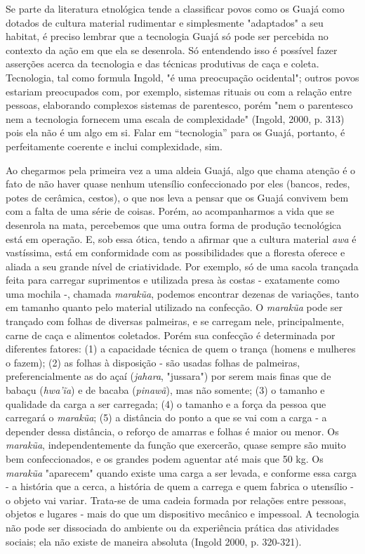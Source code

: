 Se parte da literatura etnológica tende a classificar povos como os
Guajá como dotados de cultura material rudimentar e simplesmente
"adaptados" a seu habitat, é preciso lembrar que a tecnologia Guajá só
pode ser percebida no contexto da ação em que ela se desenrola. Só
entendendo isso é possível fazer asserções acerca da tecnologia e das
técnicas produtivas de caça e coleta. Tecnologia, tal como formula
Ingold, "é uma preocupação ocidental"; outros povos estariam preocupados
com, por exemplo, sistemas rituais ou com a relação entre pessoas,
elaborando complexos sistemas de parentesco, porém "nem o parentesco nem
a tecnologia fornecem uma escala de complexidade" (Ingold, 2000, p. 313)
pois ela não é um algo em si. Falar em ``tecnologia'' para os Guajá,
portanto, é perfeitamente coerente e inclui complexidade, sim.

Ao chegarmos pela primeira vez a uma aldeia Guajá, algo que chama
atenção é o fato de não haver quase nenhum utensílio confeccionado por
eles (bancos, redes, potes de cerâmica, cestos), o que nos leva a pensar
que os Guajá convivem bem com a falta de uma série de coisas. Porém, ao
acompanharmos a vida que se desenrola na mata, percebemos que uma outra
forma de produção tecnológica está em operação. E, sob essa ótica, tendo
a afirmar que a cultura material \emph{awa} é vastíssima, está em
conformidade com as possibilidades que a floresta oferece e aliada a seu
grande nível de criatividade. Por exemplo, só de uma sacola trançada
feita para carregar suprimentos e utilizada presa às costas - exatamente
como uma mochila -, chamada \emph{marakũa}, podemos encontrar dezenas de
variações, tanto em tamanho quanto pelo material utilizado na confecção.
O \emph{marakũa} pode ser trançado com folhas de diversas palmeiras, e
se carregam nele, principalmente, carne de caça e alimentos coletados.
Porém sua confecção é determinada por diferentes fatores: (1) a
capacidade técnica de quem o trança (homens e mulheres o fazem); (2) as
folhas à disposição - são usadas folhas de palmeiras, preferencialmente
as do açaí (\emph{jahara}, "jussara") por serem mais finas que de babaçu
(\emph{hwa'ĩa}) e de bacaba (\emph{pinawã}), mas não somente; (3) o
tamanho e qualidade da carga a ser carregada; (4) o tamanho e a força da
pessoa que carregará o \emph{marakũa}; (5) a distância do ponto a que se
vai com a carga - a depender dessa distância, o reforço de amarras e
folhas é maior ou menor. Os \emph{marakũa}, independentemente da função
que exercerão, quase sempre são muito bem confeccionados, e os grandes
podem aguentar até mais que 50 kg. Os \emph{marakũa} "aparecem" quando
existe uma carga a ser levada, e conforme essa carga - a história que a
cerca, a história de quem a carrega e quem fabrica o utensílio - o
objeto vai variar. Trata-se de uma cadeia formada por relações entre
pessoas, objetos e lugares - mais do que um dispositivo mecânico e
impessoal. A tecnologia não pode ser dissociada do ambiente ou da
experiência prática das atividades sociais; ela não existe de maneira
absoluta (Ingold 2000, p. 320-321).


